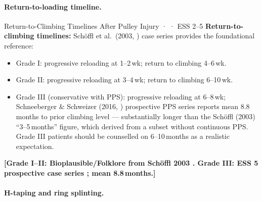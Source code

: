 \paragraph{Return-to-loading timeline.}\leavevmode

\begin{bioplausbox}{Return-to-Climbing Timelines After Pulley Injury · \bioplausible · ESS 2--5}
\textbf{Return-to-climbing timelines:} Sch\"{o}ffl et al.\ (2003, \cite{SHWS03}) case series provides the foundational reference:
\begin{itemize}[leftmargin=1.5em,noitemsep]
  \item Grade I: progressive reloading at 1--2\,wk; return to climbing 4--6\,wk.
  \item Grade II: progressive reloading at 3--4\,wk; return to climbing 6--10\,wk.
  \item Grade III (conservative with PPS): progressive reloading at 6--8\,wk; Schneeberger \& Schweizer (2016, \cite{SS16}) prospective PPS series reports mean 8.8\,months to prior climbing level --- substantially longer than the Sch\"{o}ffl (2003) ``3--5\,months'' figure, which derived from a subset without continuous PPS. Grade III patients should be counselled on 6--10\,months as a realistic expectation.
\end{itemize}
\textbf{[Grade I--II: Bioplausible/Folklore from Sch\"{o}ffl 2003 \cite{SHWS03}. Grade III: ESS 5 prospective case series \cite{SS16}; mean 8.8\,months.]}
\end{bioplausbox}

\paragraph{H-taping and ring splinting.}\leavevmode

